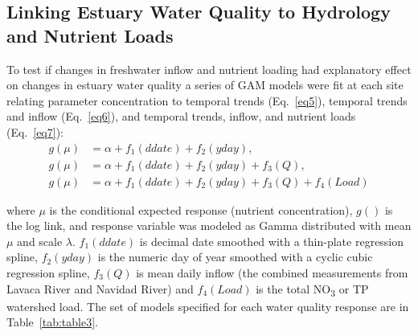 \documentclass[sn-basic,referee,lineno,pdflatex]{sn-jnl}
\begin{document}
\hypertarget{linking-estuary-water-quality-to-hydrology-and-nutrient-loads}{%
\subsection{Linking Estuary Water Quality to Hydrology and Nutrient
Loads}\label{linking-estuary-water-quality-to-hydrology-and-nutrient-loads}}

To test if changes in freshwater inflow and nutrient loading had
explanatory effect on changes in estuary water quality a series of GAM
models were fit at each site relating parameter concentration to
temporal trends (Eq.~\ref{eq5}), temporal trends and inflow
(Eq.~\ref{eq6}), and temporal trends, inflow, and nutrient loads
(Eq.~\ref{eq7}): \begin{align}
g(\mu) &= \alpha + f_1(ddate) + f_2(yday), \label{eq5} \\
g(\mu) &= \alpha + f_1(ddate) + f_2(yday) + f_3(Q), \label{eq6} \\
g(\mu) &= \alpha + f_1(ddate) + f_2(yday) + f_3(Q) + f_4(Load) \label{eq7}
\end{align}

where \(\mu\) is the conditional expected response (nutrient
concentration), \(g()\) is the log link, and response variable was
modeled as Gamma distributed with mean \(\mu\) and scale \(\lambda\).
\(f_1(ddate)\) is decimal date smoothed with a thin-plate regression
spline, \(f_2(yday)\) is the numeric day of year smoothed with a cyclic
cubic regression spline, \(f_3(Q)\) is mean daily inflow (the combined
measurements from Lavaca River and Navidad River) and \(f_4(Load)\) is
the total NO\textsubscript{3} or TP watershed load. The set of models
specified for each water quality response are in Table~\ref{tab:table3}.
\end{document}
